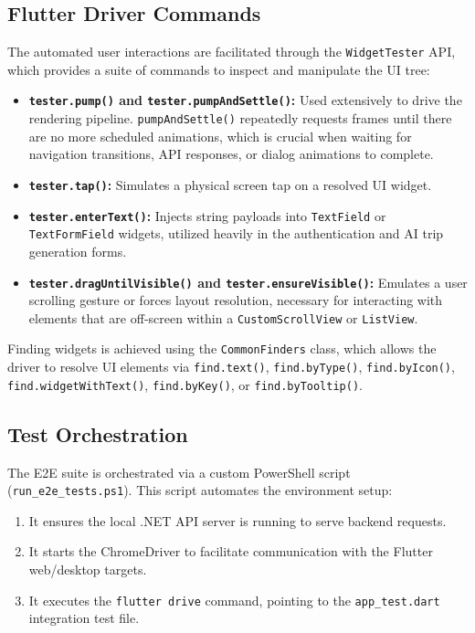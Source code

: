 \subsection{Flutter Driver Commands}
The automated user interactions are facilitated through the \texttt{WidgetTester} API, which provides a suite of commands to inspect and manipulate the UI tree:
\begin{itemize}
    \item \textbf{\texttt{tester.pump()} and \texttt{tester.pumpAndSettle()}:} Used extensively to drive the rendering pipeline. \texttt{pumpAndSettle()} repeatedly requests frames until there are no more scheduled animations, which is crucial when waiting for navigation transitions, API responses, or dialog animations to complete.
    \item \textbf{\texttt{tester.tap()}:} Simulates a physical screen tap on a resolved UI widget.
    \item \textbf{\texttt{tester.enterText()}:} Injects string payloads into \texttt{TextField} or \texttt{TextFormField} widgets, utilized heavily in the authentication and AI trip generation forms.
    \item \textbf{\texttt{tester.dragUntilVisible()} and \texttt{tester.ensureVisible()}:} Emulates a user scrolling gesture or forces layout resolution, necessary for interacting with elements that are off-screen within a \texttt{CustomScrollView} or \texttt{ListView}.
\end{itemize}

Finding widgets is achieved using the \texttt{CommonFinders} class, which allows the driver to resolve UI elements via \texttt{find.text()}, \texttt{find.byType()}, \texttt{find.byIcon()}, \texttt{find.widgetWithText()}, \texttt{find.byKey()}, or \texttt{find.byTooltip()}.

\subsection{Test Orchestration}
The E2E suite is orchestrated via a custom PowerShell script (\texttt{run\_e2e\_tests.ps1}). This script automates the environment setup:
\begin{enumerate}
    \item It ensures the local .NET API server is running to serve backend requests.
    \item It starts the ChromeDriver to facilitate communication with the Flutter web/desktop targets.
    \item It executes the \texttt{flutter drive} command, pointing to the \texttt{app\_test.dart} integration test file.
\end{enumerate}

